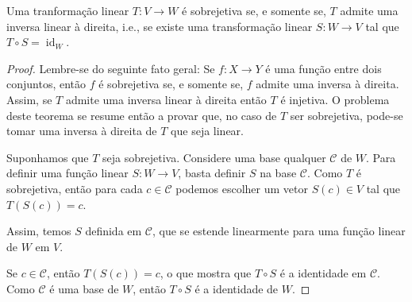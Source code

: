 \begin{theorem}
	Uma tranformação linear $T\colon V\to W$ é sobrejetiva se, e somente se, $T$ admite uma inversa linear à direita, i.e., se existe uma transformação linear $S\colon W\to V$ tal que $T\circ S=\operatorname{id}_W$.
\end{theorem}

\begin{proof}
	Lembre-se do seguinte fato geral: Se $f\colon X\to Y$ é uma função entre dois conjuntos, então $f$ é sobrejetiva se, e somente se, $f$ admite uma inversa à direita. Assim, se $T$ admite uma inversa linear à direita então $T$ é injetiva. O problema deste teorema se resume então a provar que, no caso de $T$ ser sobrejetiva, pode-se tomar uma inversa à direita de $T$ que seja linear.
	
	Suponhamos que $T$ seja sobrejetiva. Considere uma base qualquer $\mathcal{C}$ de $W$. Para definir uma função linear $S\colon W\to V$, basta definir $S$ na base $\mathcal{C}$. Como $T$ é sobrejetiva, então para cada $c\in\mathcal{C}$ podemos escolher um vetor $S(c)\in V$ tal que $T(S(c))=c$.
	
	Assim, temos $S$ definida em $\mathcal{C}$, que se estende linearmente para uma função linear de $W$ em $V$.
	
	Se $c\in\mathcal{C}$, então $T(S(c))=c$, o que mostra que $T\circ S$ é a identidade em $\mathcal{C}$. Como $\mathcal{C}$ é uma base de $W$, então $T\circ S$ é a identidade de $W$.
\end{proof}